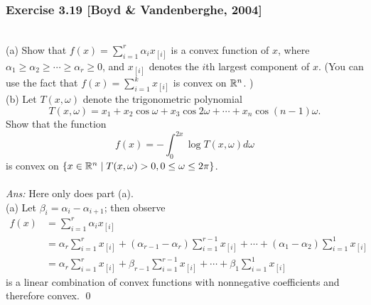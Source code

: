\documentclass[12pt,a4paper]{article}
\newcommand{\INT}[2]{\int_{#1}^{#2}}
\newcommand{\SUM}[2]{\sum\limits_{#1}^{#2}}
\def\R{\ifmmode\mathbb R\fi}
\begin{document}
\newpage\subsubsection*{Exercise 3.19 [Boyd \& Vandenberghe, 2004]}
 \\
(a) Show that $f(x) = \sum^r_{i=1}\alpha_ix_{[i]}$ is a convex function of $x$, where $\alpha_1 \geq \alpha_2 \geq \cdots \geq \alpha_r \geq 0$, and $x_{[i]}$ denotes the $i$th largest component of $x$. (You can use the fact that $f(x) = \sum_{i=1}^k x_{[i]}$ is convex on $\R^n$. )\\
(b) Let $T(x, \omega)$ denote the trigonometric polynomial
$$T(x,\omega) = x_1 + x_2 \cos\omega + x_3\cos2\omega + \cdots + x_n\cos(n-1)\omega.$$
Show that the function
$$f(x) = -\INT0{2x} \log T(x,\omega)d\omega$$
is convex on $\{x \in \R^n \mid T(x,\omega)>0, 0\leq \omega \leq 2\pi\}$. \\
\\
{\it Ans:} Here only does part (a). \\
(a) Let $\beta_i = \alpha_i - \alpha_{i+1}$; then observe
\begin{align*}
f(x) & = \SUM{i=1}r \alpha_i x_{[i]} \\
&= \alpha_r\SUM{i=1}rx_{[i]} + (\alpha_{r-1}-\alpha_r)\SUM{i=1}{r-1}x_{[i]} + \cdots + (\alpha_1 - \alpha_2)\SUM{i=1}1 x_{[i]} \\
&= \alpha_r \SUM{i=1}r x_{[i]} + \beta_{r-1}\SUM{i=1}{r-1}x_{[i]} + \cdots + \beta_1\SUM{i=1}{1}x_{[i]}
\end{align*}
is a linear combination of convex functions with nonnegative coefficients and therefore convex.  \qed
\end{document}
